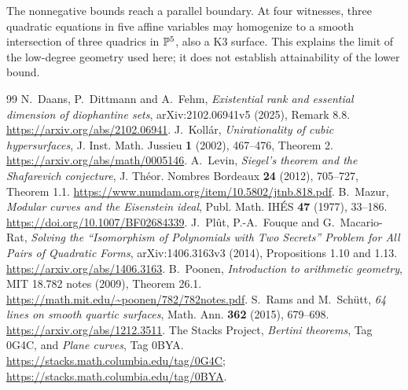 \documentclass[11pt]{article}
\theoremstyle{remark}\newtheorem{remark}[theorem]{Remark}
\begin{document}
The nonnegative bounds reach a parallel boundary. At four witnesses, three quadratic equations in five affine variables may homogenize to a smooth intersection of three quadrics in \(\mathbb P^5\), also a K3 surface. This explains the limit of the low-degree geometry used here; it does not establish attainability of the lower bound.

\begin{thebibliography}{99}
 N.~Daans, P.~Dittmann and A.~Fehm, \emph{Existential rank and essential dimension of diophantine sets}, arXiv:2102.06941v5 (2025), Remark 8.8. \url{https://arxiv.org/abs/2102.06941}.
 J.~Koll\'ar, \emph{Unirationality of cubic hypersurfaces}, J. Inst. Math. Jussieu \textbf{1} (2002), 467--476, Theorem 2. \url{https://arxiv.org/abs/math/0005146}.
 A.~Levin, \emph{Siegel's theorem and the Shafarevich conjecture}, J. Th\'eor. Nombres Bordeaux \textbf{24} (2012), 705--727, Theorem 1.1. \url{https://www.numdam.org/item/10.5802/jtnb.818.pdf}.
 B.~Mazur, \emph{Modular curves and the Eisenstein ideal}, Publ. Math. IH\'ES \textbf{47} (1977), 33--186. \url{https://doi.org/10.1007/BF02684339}.
 J.~Pl\^ut, P.-A.~Fouque and G.~Macario-Rat, \emph{Solving the ``Isomorphism of Polynomials with Two Secrets'' Problem for All Pairs of Quadratic Forms}, arXiv:1406.3163v3 (2014), Propositions 1.10 and 1.13. \url{https://arxiv.org/abs/1406.3163}.
 B.~Poonen, \emph{Introduction to arithmetic geometry}, MIT 18.782 notes (2009), Theorem 26.1. \url{https://math.mit.edu/~poonen/782/782notes.pdf}.
 S.~Rams and M.~Sch\"utt, \emph{64 lines on smooth quartic surfaces}, Math. Ann. \textbf{362} (2015), 679--698. \url{https://arxiv.org/abs/1212.3511}.
 The Stacks Project, \emph{Bertini theorems}, Tag 0G4C, and \emph{Plane curves}, Tag 0BYA. \url{https://stacks.math.columbia.edu/tag/0G4C}; \url{https://stacks.math.columbia.edu/tag/0BYA}.
\end{thebibliography}
\end{document}
